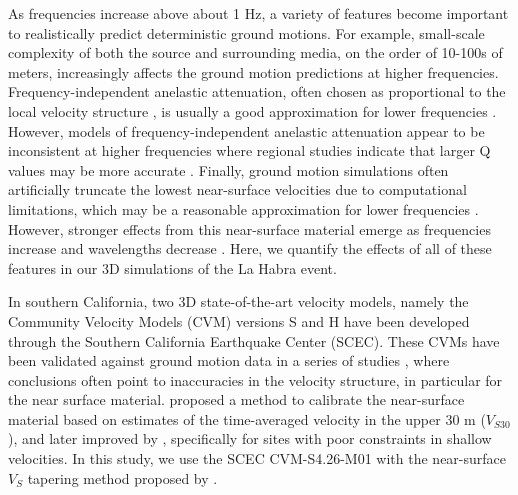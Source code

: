 As frequencies increase above about 1 Hz, a variety of features become important to realistically predict deterministic ground motions. For example, small-scale complexity of both the source and surrounding media, on the order of 10-100s of meters, increasingly affects the ground motion predictions at higher frequencies. Frequency-independent anelastic attenuation, often chosen as proportional to the local velocity structure , is usually a good approximation for lower frequencies \citep[e.g., up to ~1 Hz][]{liu1976velocity,fehler1992separation}. However, models of frequency-independent anelastic attenuation appear to be inconsistent at higher frequencies where regional studies indicate that larger Q values may be more accurate . Finally, ground motion simulations often artificially truncate the lowest near-surface velocities due to computational limitations, which may be a reasonable approximation for lower frequencies . However, stronger effects from this near-surface material emerge as frequencies increase and wavelengths decrease . Here, we quantify the effects of all of these features in our 3D simulations of the La Habra event.

In southern California, two 3D state-of-the-art velocity models, namely the Community Velocity Models (CVM) versions S and H have been developed through the Southern California Earthquake Center (SCEC). These CVMs have been validated against ground motion data in a series of studies , where conclusions often point to inaccuracies in the velocity structure, in particular for the near surface material. \citet{elyVs30derivedNearsurfaceSeismic2010} proposed a method to calibrate the near-surface material based on estimates of the time-averaged velocity in the upper 30 m ($V_{S30}$), and later improved by \citet{huCalibrationNearsurfaceSeismic2021}, specifically for sites with poor constraints in shallow velocities. In this study, we use the SCEC CVM-S4.26-M01 with the near-surface $V_S$ tapering method proposed by \citet{huCalibrationNearsurfaceSeismic2021}.

